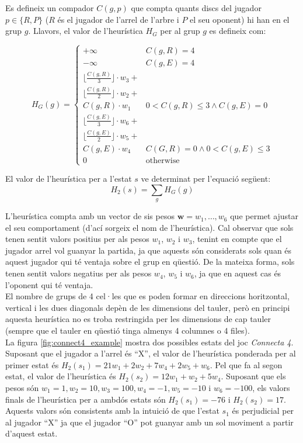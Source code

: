 \documentclass[12pt,a4paper]{article}
\begin{document}
Es defineix un compador $C(g, p)$ que compta quants discs del jugador $p \in \{R, P\}$ ($R$ és el jugador de l'arrel de l'arbre i $P$ el seu oponent) hi han en el grup $g$. Llavors, el valor de l'heurística $H_G$ per al grup $g$ es defineix com:

\begin{equation}
H_G(g) = \begin{cases}
+\infty & C(g, R) = 4\\
-\infty & C(g, E) = 4\\
\lfloor \frac{C(g, R)}{3} \rfloor \cdot w_3 + &\\
\lfloor \frac{C(g, R)}{2} \rfloor \cdot w_2 + & \\
C(g, R) \cdot w_1&0 < C(g, R) \leq 3 \wedge C(g, E)  = 0\\
\lfloor \frac{C(g, E)}{3} \rfloor \cdot w_6 + &\\
\lfloor \frac{C(g, E)}{2} \rfloor \cdot w_5 + &\\
C(g, E) \cdot w_4 &C(G, R)  = 0 \wedge 0 < C(g, E) \leq 3\\
0 & \text{otherwise}
\end{cases}
\end{equation}

El valor de l'heurística per a l'estat $s$ ve determinat per l'equació següent:
\begin{equation}
H_2(s) = \sum_{g} H_G(g)
\end{equation}

L'heurística compta amb un vector de sis pesos $\mathbf{w} = w_1, \ldots, w_6$ que permet ajustar el seu comportament (d'ací sorgeix el nom de l'heurística). Cal observar que sols tenen sentit valors positius per als pesos $w_1$, $w_2$ i $w_3$, tenint en compte que el jugador arrel vol guanyar la partida, ja que aquests són considerats sols quan és aquest jugador qui té ventaja sobre el grup en qüestió. De la mateixa forma, sols tenen sentit valors negatius per als pesos $w_4$, $w_5$ i $w_6$, ja que en aquest cas és l'oponent qui té ventaja.\\

El nombre de grups de 4 cel·les que es poden formar en direccions horitzontal, vertical i les dues diagonals depèn de les dimensions del tauler, però en principi aquesta heurística no es troba restringida per les dimensions de cap tauler (sempre que el tauler en qüestió tinga almenys 4 columnes o 4 files).\\

La figura \ref{fig:connect4_example} mostra dos possibles estats del joc \emph{Connecta 4}. Suposant que el jugador a l'arrel és ``X'', el valor de l'heurística ponderada per al primer estat és $H_2(s_1) = 21 w_1 + 2 w_2 + 7 w_4 + 2 w_5 + w_6$. Pel que fa al segon estat, el valor de l'heurística és $H_2(s_2) = 12 w_1 + w_2 + 5 w_4$. Suposant que els pesos són $w_1 = 1, w_2 = 10, w_3 = 100, w_4 = -1, w_5 = -10$ i $w_6 = -100$, els valors finals de l'heurística per a ambdós estats són $H_2(s_1) = -76$ i $H_2(s_2) = 17$. Aquests valors són consistents amb la intuició de que l'estat $s_1$ és perjudicial per al jugador ``X'' ja que el jugador ``O'' pot guanyar amb un sol moviment a partir d'aquest estat.\\
\end{document}

